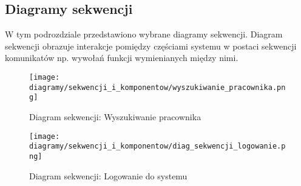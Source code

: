 \subsection{Diagramy sekwencji}
W tym podrozdziale przedstawiono wybrane diagramy sekwencji. Diagram sekwencji obrazuje interakcje pomiędzy częściami systemu w postaci sekwencji komunikatów np. wywołań funkcji wymienianych między nimi. 

\begin{figure}[h]
    \centering
    \texttt{[image: diagramy/sekwencji\_i\_komponentow/wyszukiwanie\_pracownika.png]}
    \caption{Diagram sekwencji: Wyszukiwanie pracownika}
    \label{fig:wyszukiwanie_pracownika}
\end{figure} 

\begin{figure}[h]
    \centering
    \texttt{[image: diagramy/sekwencji\_i\_komponentow/diag\_sekwencji\_logowanie.png]}
    \caption{Diagram sekwencji: Logowanie do systemu}
    \label{fig:diag_sekwencji_logowanie.png}
\end{figure} 